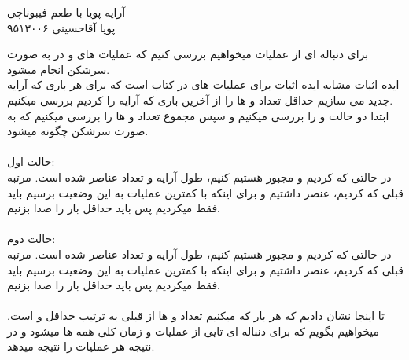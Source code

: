 \documentclass[11pt]{letter}
\begin{document}
	\begin{center}
		{\huge آرایه پویا با طعم فیبوناچی}\\
		{ پویا آقاحسینی ۹۵۱۳۰۰۶}
	\end{center}
	\begin{RTL}
	برای دنباله ای از عملیات میخواهیم بررسی کنیم که عملیات های 
	و
	در 
	به صورت سرشکن انجام میشود. \\
	ایده اثبات مشابه ایده اثبات برای عملیات های
	در کتاب 
	است که برای هر باری که آرایه جدید می سازیم حداقل تعداد 
	و
	ها را از آخرین باری که آرایه را 
	کردیم بررسی میکنیم. \\
	ابتدا دو حالت 
	و
	را بررسی میکنیم و سپس مجموع تعداد 
	و
	ها را بررسی میکنیم که به صورت سرشکن چگونه میشود.\\
	\\
{\LARGE حالت اول:}\\
	در حالتی که 
	کردیم و مجبور هستیم 
	کنیم، طول آرایه
	و تعداد عناصر 
	شده است. مرتبه قبلی که 
		کردیم،
			عنصر داشتیم و برای اینکه با کمترین عملیات به این وضعیت برسیم باید فقط 
			میکردیم پس باید حداقل 
				بار 
				را صدا بزنیم.\\
				\\
				{\LARGE حالت دوم:}\\
				در حالتی که 
				کردیم و مجبور هستیم 
				کنیم، طول آرایه
				و تعداد عناصر 
				شده است. مرتبه قبلی که 
				کردیم،
				عنصر داشتیم و برای اینکه با کمترین عملیات به این وضعیت برسیم باید فقط 
				میکردیم پس باید حداقل 
				بار 
				را صدا بزنیم.
				\\
				\\
				تا اینجا نشان دادیم که هر بار که 
				میکنیم تعداد 
				و
				ها از 
				قبلی به ترتیب حداقل 
								و
								است.
								 میخواهیم بگویم که برای دنباله ای 
								تایی از عملیات
								و
								زمان کلی همه 
									ها 
								میشود و در نتیجه هر عملیات را 
								نتیجه میدهد.

\end{RTL}
\end{document}
